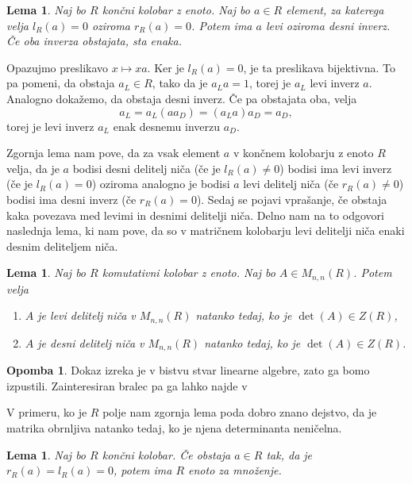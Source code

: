 \documentclass[a4paper, 12pt]{amsart}
\theoremstyle{definition} %
\newtheorem{opomba}[definicija]{Opomba}
\theoremstyle{plain} %
\newtheorem{lema}[definicija]{Lema}
\DeclareMathOperator{\deter}{det}
\begin{document}
\begin{lema}
\label{inverz}
Naj bo $R$ končni kolobar z enoto. Naj bo $a\in R$ element, za katerega velja $l_R(a) = 0 $ oziroma $r_R(a)=0$. Potem ima $a$ levi oziroma desni inverz. Če oba inverza obstajata, sta enaka. 
\end{lema}

\proof
Opazujmo preslikavo $x \mapsto xa$. Ker je $l_R(a) = 0$, je ta preslikava bijektivna. To pa pomeni, da obstaja $a_L\in R$, tako da je $a_L a = 1$, torej je $a_L$ levi inverz $a$. Analogno dokažemo, da obstaja desni inverz. Če pa obstajata oba, velja
$$
a_L = a_L(aa_D) = (a_L a)a_D = a_D,
$$
torej je levi inverz $a_L$ enak desnemu inverzu $a_D$.
\endproof

Zgornja lema nam pove, da za vsak element $a$ v končnem kolobarju z enoto $R$ velja, da je $a$ bodisi desni delitelj niča (če je $l_R(a)\neq 0$) bodisi ima levi inverz (če je $l_R(a)=0$) oziroma analogno je bodisi $a$ levi delitelj niča (če $r_R(a) \neq 0$) bodisi ima desni inverz (če $r_R(a) = 0$). Sedaj se pojavi vprašanje, če obstaja kaka povezava med levimi in desnimi delitelji niča. Delno nam na to odgovori naslednja lema, ki nam pove, da so v matričnem kolobarju levi delitelji niča enaki desnim deliteljem niča.

\begin{lema}
\label{enostranskiDelitelji0Matricni}
Naj bo $R$ komutativni kolobar z enoto. Naj bo $A\in M_{n,n}(R)$. Potem velja
\begin{enumerate}
\item $A$ je levi delitelj niča v $M_{n,n}(R)$ natanko tedaj, ko je $\deter(A)\in Z(R)$,
\item $A$ je desni delitelj niča v $M_{n,n}(R)$ natanko tedaj, ko je $\deter(A)\in Z(R)$.
\end{enumerate}
\end{lema}

\begin{opomba}
Dokaz izreka je v bistvu stvar linearne algebre, zato ga bomo izpustili. Zainteresiran bralec pa ga lahko najde v \cite[Theorem 9.1]{Brown}
\end{opomba}

V primeru, ko je $R$ polje nam zgornja lema poda dobro znano dejstvo, da je matrika obrnljiva natanko tedaj, ko je njena determinanta neničelna.


\begin{lema}
\label{enota}
Naj bo $R$ končni kolobar. Če obstaja $a\in R$ tak, da je $r_R(a) = l_R(a) = 0$, potem ima $R$ enoto za množenje.
\end{lema}
\end{document}
